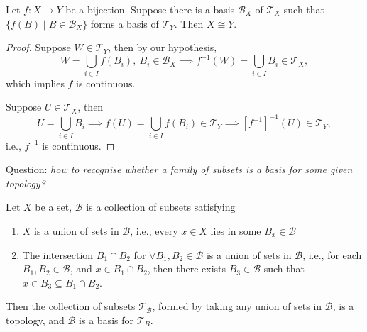 \begin{corollary}\label{cor:3:1}
Let $f:X\to Y$ be a bijection. Suppose there is a basis $\mathcal{B}_X$ of $\mathcal{T}_X$ such that $\{f(B)\mid B\in\mathcal{B}_X\}$ forms a basis of $\mathcal{T}_Y$. Then $X\cong Y$.
\end{corollary}
\begin{proof}
Suppose $W\in\mathcal{T}_Y$, then by our hypothesis,
\[
W=\bigcup_{i\in I}f(B_i),\
B_i\in\mathcal{B}_X\implies
f^{-1}(W)=\bigcup_{i\in I}B_i\in\mathcal{T}_X,
\]
which implies $f$ is continuous.

Suppose $U\in\mathcal{T}_X$, then
\[
U=\bigcup_{i\in I}B_i\implies
f(U)=\bigcup_{i\in I}f(B_i)\in\mathcal{T}_Y\implies
[f^{-1}]^{-1}(U)\in\mathcal{T}_Y,
\]
i.e., $f^{-1}$ is continuous.
\end{proof}

Question: \textit{how to recognise 
whether a family of subsets is a basis for some given topology?}

\begin{proposition}
\label{pro:3:4:1}
Let $X$ be a set, $\mathcal{B}$ is a collection of subsets satisfying
\begin{enumerate}
\item
$X$ is a union of sets in $\mathcal{B}$, i.e., 
every $x\in X$ lies in some $B_x\in\mathcal{B}$
\item
The intersection $B_1\cap B_2$ for $\forall B_1,B_2\in\mathcal{B}$ is a union of sets in $\mathcal{B}$, i.e., for each $B_1,B_2\in\mathcal{B}$, and $x\in B_1\cap B_2$, then there exists $B_3\in\mathcal{B}$ such that $x\in B_3\subseteq B_1\cap B_2$.
\end{enumerate}
Then the collection of subsets $\mathcal{T}_{\mathcal{B}}$, formed by taking any union of sets in $\mathcal{B}$, is a topology, and $\mathcal{B}$ is a basis for $\mathcal{T}_B$.
\end{proposition}

